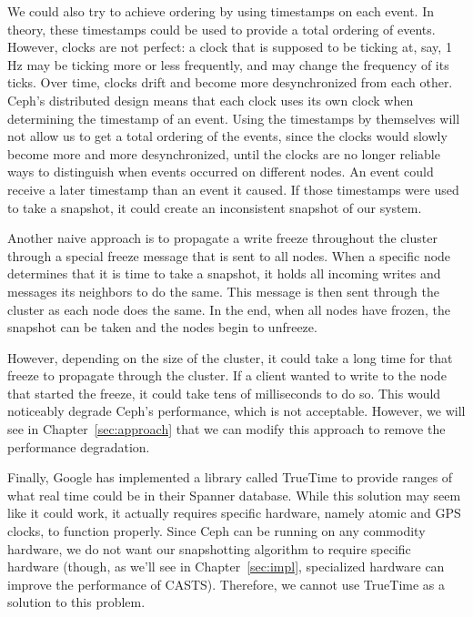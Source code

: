We could also try to achieve ordering by using timestamps on each event. In theory,
these timestamps could be used to provide a total ordering of events. However,
clocks are not perfect: a clock that is supposed to be ticking at, say, 1 Hz 
may be ticking more or less frequently, and may change the frequency of its 
ticks. Over time, clocks drift and become more
desynchronized from each other. Ceph's distributed design means that
each clock uses its own clock when determining the timestamp of an
event. Using the timestamps by themselves will not allow us to get a
total ordering of the events, since the clocks would slowly become
more and more desynchronized, until the clocks are no longer reliable
ways to distinguish when events occurred on different nodes. An event
could receive a later timestamp than an event it caused. If those timestamps 
were used to take a snapshot, it could create an inconsistent snapshot of our 
system.

Another naive approach is to propagate a write freeze throughout the
cluster through a special freeze message that is sent to all nodes.  When a specific node determines that it is time to take a
snapshot, it holds all incoming writes and messages its neighbors to
do the same. This message is then sent through the cluster as each node
does the same. In the end, when all nodes have frozen, the snapshot
can be taken and the nodes begin to unfreeze.

However, depending on the size of the cluster, it could take a long
time for that freeze to propagate through the cluster. If a client
wanted to write to the node that started the freeze, it could take
tens of milliseconds to do so.  This would noticeably degrade Ceph's
performance, which is not acceptable.  However, we will see in
Chapter~\ref{sec:approach} that we can modify this approach to remove
the performance degradation.

Finally, Google has implemented a library called TrueTime to provide
ranges of what real time could be in their Spanner database. While
this solution may seem like it could work, it actually requires
specific hardware, namely atomic and GPS clocks, to function
properly. Since Ceph can be running on any commodity hardware, we do
not want our snapshotting algorithm to require specific hardware (though, as we'll
see in Chapter~\ref{sec:impl}, specialized hardware can improve the
performance of CASTS). Therefore, we cannot use TrueTime as a
solution to this problem. 
















